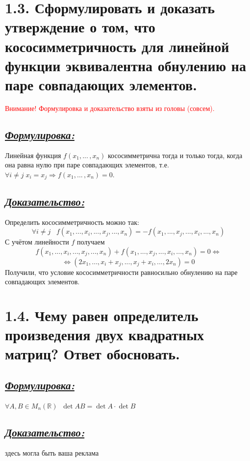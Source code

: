 \documentclass{article}
\begin{document}
\section*{\LARGE 1.3. Сформулировать и доказать утверждение о том, что кососимметричность для линейной функции эквивалентна обнулению на паре совпадающих элементов. }
\textcolor{red}{Внимание! Формулировка и доказательство взяты из головы (совсем). }
\subsection*{\Large \underline{\textit{Формулировка: }}}
Линейная функция $f(x_1, ...\,, x_n)$ кососимметрична тогда и только тогда, когда она равна нулю при паре совпадающих элементов, т.е. $\forall i \ne j \; x_i = x_j \Rightarrow f(x_1, ...\,, x_n) = 0$.

\subsection*{\Large \underline{\textit{Доказательство: }}}
Определить кососимметричность можно так:
$$ \forall i \ne j \;\;\; f(x_1, ..., x_i, ..., x_j, ..., x_n) = -f(x_1, ..., x_j, ..., x_i, ..., x_n) $$
С учётом линейности $f$ получаем
$$ f(x_1, ..., x_i, ..., x_j, ..., x_n) + f(x_1, ..., x_j, ..., x_i, ..., x_n) = 0  \Leftrightarrow$$
$$  \Leftrightarrow (2x_1, ..., x_i + x_j, ..., x_j + x_i, ..., 2x_n) = 0 $$
Получили, что условие кососимметричности равносильно обнулению на паре совпадающих элементов.

\section*{\LARGE 1.4. Чему равен определитель произведения двух квадратных матриц? Ответ обосновать. }
\subsection*{\Large \underline{\textit{Формулировка: }}}
$\forall A, B \in M_n(\mathbb{R}) \;\; \det{AB} = \det{A}\cdot\det{B}$

\subsection*{\Large \underline{\textit{Доказательство: }}}
здесь могла быть ваша реклама
\end{document}

